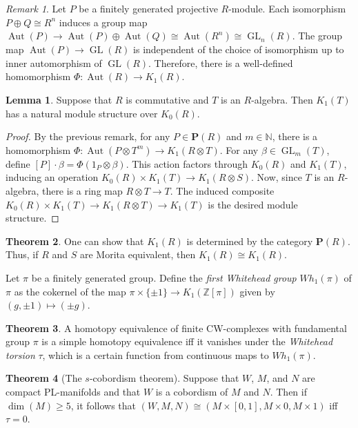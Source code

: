 \documentclass[10pt,letterpaper,cm]{nupset}
\theoremstyle{definition}
\theoremstyle{theorem}
\newtheorem{theorem}{Theorem}
\newtheorem{lemma}[theorem]{Lemma}
\theoremstyle{remark}
\newtheorem{remark}{Remark}
\newcommand{\N}{\mathbb N}
\renewcommand{\P}{\mathbf P}
\newcommand{\Z}{\mathbb Z}
\newcommand{\1}{\mathbf{1}}
\newcommand{\0}{\vec 0}
\DeclareMathOperator*{\GL}{GL}
\DeclareMathOperator{\aut}{Aut}
\begin{document}
\begin{remark}
Let $P$ be a finitely generated projective $R$-module. Each isomorphism $P \oplus Q \cong R^n$ induces a group map $\aut(P) \to \aut(P) \oplus \aut(Q) \cong \aut(R^n) \cong \GL_n(R)$. The group map $\aut(P) \to \GL(R)$ is independent of the choice of isomorphism up to inner automorphism of $\GL(R)$. Therefore, there is a well-defined homomorphism $\Phi: \aut(R) \to K_1(R)$.
\end{remark}

\begin{lemma}
Suppose that $R$ is commutative and $T$ is an $R$-algebra. Then $K_1(T)$ has a natural module structure over $K_0(R)$.
\end{lemma}
\begin{proof}
By the previous remark, for any $P \in \P(R)$ and $m\in \N$, there is a homomorphism $\Phi : \aut(P \otimes T^m) \to K_1(R\otimes T).$ For any $\beta \in \GL_m(T)$, define $[P] \cdot \beta = \Phi(1_P \otimes \beta)$. This action factors through $K_0(R)$ and $K_1(T)$, inducing an operation $K_0(R) \times K_1(T) \to K_1(R \otimes S)$. Now, since $T$ is an $R$-algebra, there is a ring map $R\otimes T \to T$. The induced composite $K_0(R) \times K_1(T) \to K_1(R \otimes T) \to K_1(T)$ is the desired module structure.
\end{proof}

\begin{theorem}
One can show that $K_1(R)$ is determined by the category $\P(R)$. Thus, if $R$ and $S$ are Morita equivalent, then $K_1(R) \cong K_1(R)$. 
\end{theorem}

\smallskip

Let $\pi$ be a finitely generated group. Define the \textit{first Whitehead group} $Wh_1(\pi)$ of $\pi$ as the cokernel of the map $\pi \times \{\pm 1\}\to K_1(\Z[\pi])$ given by $\left(g, \pm 1\right)\mapsto \left(\pm g\right)$. 

\begin{theorem}
A homotopy equivalence of finite CW-complexes with fundamental group $\pi$ is a simple homotopy equivalence iff it vanishes under the \textit{Whitehead torsion} $\tau$, which is a certain function from continuous maps to $Wh_1(\pi)$.
\end{theorem}

\begin{theorem}[The $s$-cobordism theorem]
Suppose that $W$, $M$, and $N$ are compact PL-manifolds and that $W$ is a cobordism of $M$ and $N$. Then if $\dim(M) \geq 5$, it follows that $(W, M, N) \cong (M \times [0, 1], M \times 0, M \times 1)$ iff $\tau= 0$.
\end{theorem}
\end{document}
